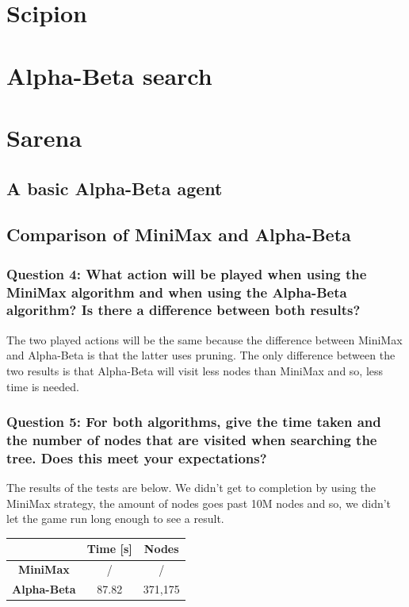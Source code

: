 \documentclass[a4paper,10pt]{article}
\begin{document}
	\newpage
	

	\section{Scipion}
	
	\section{Alpha-Beta search}	
	
	\section{Sarena}
		\subsection{A basic Alpha-Beta agent}
		
		\subsection{Comparison of MiniMax and Alpha-Beta}
			\subsubsection{Question 4: What action will be played when using the MiniMax algorithm and when using the Alpha-Beta algorithm? Is there a difference between both results?}
			The two played actions will be the same because the difference between MiniMax and Alpha-Beta is that the latter uses pruning. The only difference between the two results is that Alpha-Beta will visit less nodes than MiniMax and so, less time is needed.
			\subsubsection{Question 5: For both algorithms, give the time taken and the number of nodes that are visited when searching the tree. Does this meet your expectations?}
				The results of the tests are below. We didn't get to completion by using the MiniMax strategy, the amount of nodes goes past 10M nodes and so, we didn't let the game run long enough to see a result.
				\begin{center}
					\begin{tabular}{|c||c|c|}
						\hline 
						 & \textbf{Time [s]} & \textbf{Nodes} \\ 
						\hline 
						\textbf{MiniMax} & / & / \\ 
						\hline 
						\textbf{Alpha-Beta} & 87.82 & 371,175 \\
						\hline 
					\end{tabular}
				\end{center} 
\end{document}
